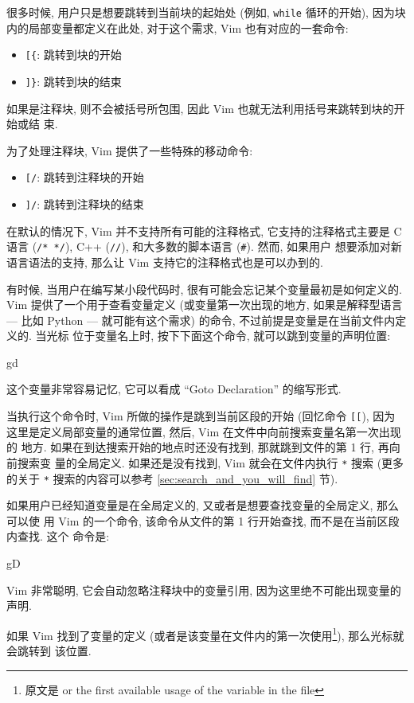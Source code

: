 很多时候, 用户只是想要跳转到当前块的起始处 (例如, \texttt{while} 循环的开始),
因为块内的局部变量都定义在此处, 对于这个需求, Vim 也有对应的一套命令:
\begin{itemize}
    \item \verb'[{': 跳转到块的开始
    \item \verb']}': 跳转到块的结束
\end{itemize}

如果是注释块, 则不会被括号所包围, 因此 Vim 也就无法利用括号来跳转到块的开始或结
束.

为了处理注释块, Vim 提供了一些特殊的移动命令:
\begin{itemize}
    \item \verb'[/': 跳转到注释块的开始
    \item \verb']/': 跳转到注释块的结束
\end{itemize}

在默认的情况下, Vim 并不支持所有可能的注释格式, 它支持的注释格式主要是 C 语言
(\verb'/* */'), C++ (\verb'//'), 和大多数的脚本语言 (\verb'#'). 然而, 如果用户
想要添加对新语言语法的支持, 那么让 Vim 支持它的注释格式也是可以办到的.

有时候, 当用户在编写某小段代码时, 很有可能会忘记某个变量最初是如何定义的. Vim
提供了一个用于查看变量定义 (或变量第一次出现的地方, 如果是解释型语言 --- 比如
Python --- 就可能有这个需求) 的命令, 不过前提是变量是在当前文件内定义的. 当光标
位于变量名上时, 按下下面这个命令, 就可以跳到变量的声明位置:
\begin{vimcode}
gd
\end{vimcode}
这个变量非常容易记忆, 它可以看成 ``Goto Declaration'' 的缩写形式.

当执行这个命令时, Vim 所做的操作是跳到当前区段的开始 (回忆命令 \verb'[['), 因为
这里是定义局部变量的通常位置, 然后, Vim 在文件中向前搜索变量名第一次出现的
地方. 如果在到达搜索开始的地点时还没有找到, 那就跳到文件的第 1 行, 再向前搜索变
量的全局定义. 如果还是没有找到, Vim 就会在文件内执行 \verb'*' 搜索 (更多的关于
\verb'*' 搜索的内容可以参考 \ref{sec:search_and_you_will_find} 节).

如果用户已经知道变量是在全局定义的, 又或者是想要查找变量的全局定义, 那么可以使
用 Vim 的一个命令, 该命令从文件的第 1 行开始查找, 而不是在当前区段内查找. 这个
命令是:
\begin{vimcode}
gD
\end{vimcode}
Vim 非常聪明, 它会自动忽略注释块中的变量引用, 因为这里绝不可能出现变量的声明.

如果 Vim 找到了变量的定义 (或者是该变量在文件内的第一次使用\footnote{原文是
or the first available usage of the variable in the file}), 那么光标就会跳转到
该位置.

